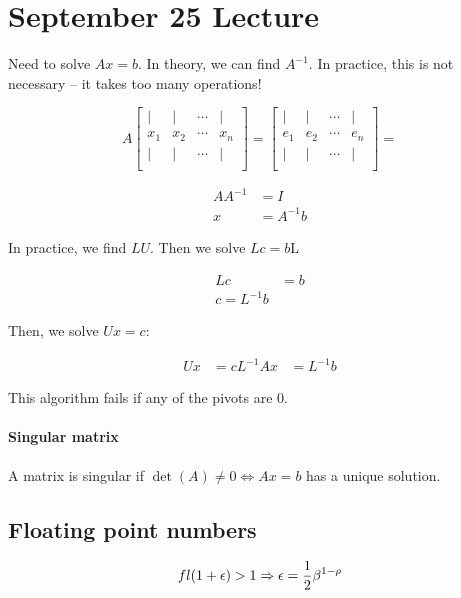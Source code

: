\section{September 25 Lecture}
Need to solve $Ax=b$. In theory, we can find $A^{-1}$. In practice, this is not necessary -- it takes too many operations!

\[
  A \begin{bmatrix}
    | & | & \cdots & |  \\
    x_1 & x_2 & \cdots & x_n  \\
    | & | & \cdots & |  \\
  \end{bmatrix} = 
  \begin{bmatrix}
    | & | & \cdots & |  \\
    e_1 & e_2 & \cdots & e_n  \\
    | & | & \cdots & |  \\
  \end{bmatrix} = 
\]

\begin{align*}
  A A^{-1} &= I \\
  x &= A^{-1}b
\end{align*}

In practice, we find $LU$. Then we solve $Lc = b$L

\begin{align*}
  Lc &= b \\
  c = L^{-1}b
\end{align*}

Then, we solve $Ux = c$:

\begin{align*}
  Ux &= c
  L^{-1} A x &= L^{-1} b
\end{align*}

This algorithm fails if any of the pivots are 0.

\paragraph{Singular matrix} A matrix is singular if $\det(A) \not= 0 \iff Ax = b$ has a unique solution.

\subsection{Floating point numbers}

\[
  fl(1 + \epsilon) > 1 \Rightarrow \epsilon = {1 \over 2} \beta^{1 - \rho}
\]

